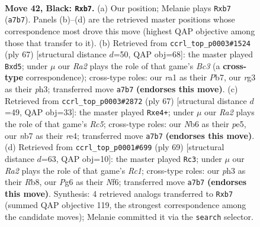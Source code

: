 \documentclass[11pt]{article}
\begin{document}
\clearpage

\begin{figure}[p]\centering
\begin{subfigure}{0.46\textwidth}\centering
\resizebox{\linewidth}{!}{%
\newchessgame
\chessboard[
  setfen={5k2/rN3p1p/rn4p1/p3p1P1/P3P3/1P4RP/4K1P1/RN6 b - - 0 42},
  showmover=false,
  pgfstyle=straightmove, color=movearrow, markmove={a7-b7}
]}
\caption{}
\end{subfigure}\hfill
\begin{subfigure}{0.46\textwidth}\centering
\resizebox{\linewidth}{!}{%
\newchessgame
\chessboard[
  setfen={3r4/1p4k1/2br2p1/3Np2p/1p2P3/1P5P/2P1R1P1/4R1K1 b - - 3 34},
  showmover=false,
  pgfstyle=straightmove, color=movearrow, markmove={c6-d5}
]}
\caption{}
\end{subfigure}
\\[4pt]
\begin{subfigure}{0.46\textwidth}\centering
\resizebox{\linewidth}{!}{%
\newchessgame
\chessboard[
  setfen={2r3k1/4p2p/6p1/4P3/p1r1RP2/1nN3P1/1P4RP/4K3 b - - 3 34},
  showmover=false,
  pgfstyle=straightmove, color=movearrow, markmove={c4-e4}
]}
\caption{}
\end{subfigure}\hfill
\begin{subfigure}{0.46\textwidth}\centering
\resizebox{\linewidth}{!}{%
\newchessgame
\chessboard[
  setfen={1rr3k1/5pp1/5n1p/4RP2/1p4P1/1P2p2P/6P1/2B2RK1 b - - 0 35},
  showmover=false,
  pgfstyle=straightmove, color=movearrow, markmove={c8-c3}
]}
\caption{}
\end{subfigure}
\caption{\textbf{Move 42, Black: \texttt{Rxb7}.} (a) Our position; Melanie plays \texttt{Rxb7} (\texttt{a7b7}). Panels (b)--(d) are the retrieved master positions whose correspondence most drove this move (highest QAP objective among those that transfer to it). (b) Retrieved from \texttt{ccrl\_top\_p0003\#1524} (ply 67) [structural distance $d$=50, QAP obj=68]: the master played \texttt{Bxd5}; under $\mu$ our \emph{Ra2} plays the role of that game's \emph{Bc3} (a \textbf{cross-type} correspondence); cross-type roles: our \emph{r}a1 as their \emph{P}b7, our \emph{r}g3 as their \emph{p}h3; transferred move \texttt{a7b7} \textbf{(endorses this move)}. (c) Retrieved from \texttt{ccrl\_top\_p0003\#2872} (ply 67) [structural distance $d$=49, QAP obj=33]: the master played \texttt{Rxe4+}; under $\mu$ our \emph{Ra2} plays the role of that game's \emph{Rc5}; cross-type roles: our \emph{N}b6 as their \emph{p}e5, our \emph{n}b7 as their \emph{r}e4; transferred move \texttt{a7b7} \textbf{(endorses this move)}. (d) Retrieved from \texttt{ccrl\_top\_p0001\#699} (ply 69) [structural distance $d$=63, QAP obj=10]: the master played \texttt{Rc3}; under $\mu$ our \emph{Ra2} plays the role of that game's \emph{Rc1}; cross-type roles: our \emph{p}h3 as their \emph{R}b8, our \emph{P}g6 as their \emph{N}f6; transferred move \texttt{a7b7} \textbf{(endorses this move)}. Synthesis: 4 retrieved analogs transferred to \texttt{Rxb7} (summed QAP objective 119, the strongest correspondence among the candidate moves); Melanie committed it via the \texttt{search} selector.}
\label{fig:thought-m83}
\end{figure}
\end{document}
